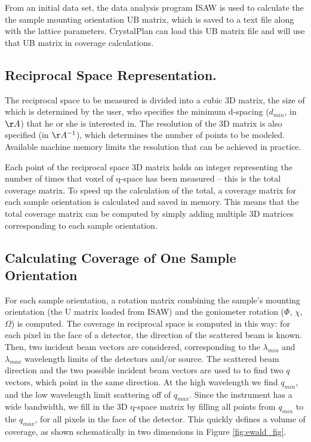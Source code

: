 \documentclass[draft]{iucr}              %
\begin{document}
From an initial data set, the data analysis program ISAW \cite{Tao2006} is used
to calculate the the sample mounting orientation UB matrix, which is saved to a text file along with the lattice
parameters. CrystalPlan can load this UB matrix file and will use that UB matrix
in coverage calculations.
   
  
\subsection{Reciprocal Space Representation.}

The reciprocal space to be measured is divided into a cubic 3D matrix, the size
of which is determined by the user, who specifies the minimum d-spacing
($d_{min}$, in $\AA$) that he or she is interested in. The resolution of the 3D
matrix is also specified (in $\AA^{-1}$), which determines the number of points to be
modeled. Available machine memory limits the resolution that can be achieved in
practice.

Each point of the reciprocal space 3D matrix holds an integer representing the 
number of times that voxel of q-space has been measured – this is the total
coverage matrix. To speed up the calculation of the total, a coverage matrix for
each sample orientation is calculated and saved in memory. This means that the
total coverage matrix can be computed by simply adding multiple 3D matrices
corresponding to each sample orientation. 
 
\subsection{Calculating Coverage of One Sample Orientation}

For each sample orientation, a rotation matrix combining the sample's mounting
orientation (the U matrix loaded from ISAW) and the goniometer rotation
($\Phi$, $\chi$, $\Omega$) is computed. The coverage in reciprocal space is
computed in this way: for each pixel in the face of a detector, the direction of
the scattered beam is known. Then, two incident beam vectors are considered,
corresponding to the $\lambda_{min}$ and $\lambda_{max}$ wavelength limits
of the detectors and/or source. The scattered beam direction and the two possible incident beam vectors
are used to to find two $q$ vectors, which point in the same direction. At the
high wavelength we find $q_{min}$, and the low wavelength limit scattering off
of $q_{max}$. Since the instrument has a wide bandwidth, we fill in the 3D q-space
matrix by filling all points from $q_{min}$ to the $q_{max}$, for all pixels in
the face of the detector. This quickly defines a volume of coverage, as shown
schematically in two dimensions in Figure \ref{fig:ewald_fig}.
\end{document}

